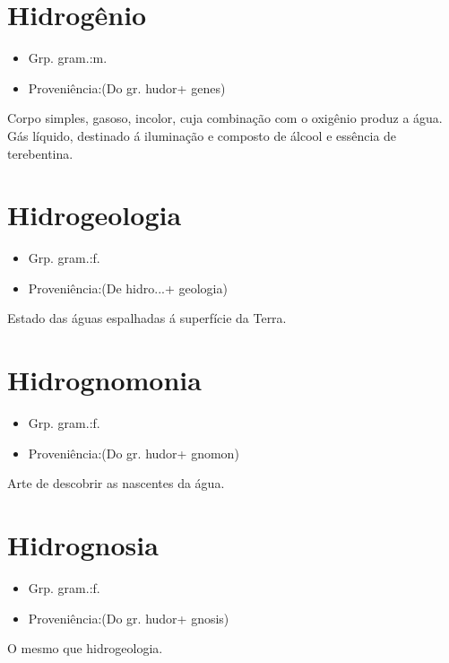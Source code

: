 \documentclass{article}
\begin{document}
\section{Hidrogênio}
\begin{itemize}
\item {Grp. gram.:m.}
\end{itemize}
\begin{itemize}
\item {Proveniência:(Do gr. \textunderscore hudor\textunderscore  + \textunderscore genes\textunderscore )}
\end{itemize}
Corpo simples, gasoso, incolor, cuja combinação com o oxigênio produz a água.
Gás líquido, destinado á iluminação e composto de álcool e essência de terebentina.
\section{Hidrogeologia}
\begin{itemize}
\item {Grp. gram.:f.}
\end{itemize}
\begin{itemize}
\item {Proveniência:(De \textunderscore hidro...\textunderscore  + \textunderscore geologia\textunderscore )}
\end{itemize}
Estado das águas espalhadas á superfície da Terra.
\section{Hidrognomonia}
\begin{itemize}
\item {Grp. gram.:f.}
\end{itemize}
\begin{itemize}
\item {Proveniência:(Do gr. \textunderscore hudor\textunderscore  + \textunderscore gnomon\textunderscore )}
\end{itemize}
Arte de descobrir as nascentes da água.
\section{Hidrognosia}
\begin{itemize}
\item {Grp. gram.:f.}
\end{itemize}
\begin{itemize}
\item {Proveniência:(Do gr. \textunderscore hudor\textunderscore  + \textunderscore gnosis\textunderscore )}
\end{itemize}
O mesmo que \textunderscore hidrogeologia\textunderscore .
\end{document}
